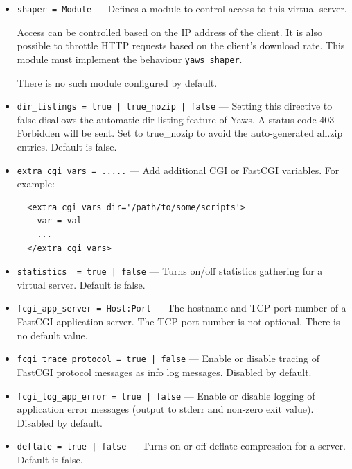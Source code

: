 \documentclass[11pt,oneside,english]{book}
\newcommand{\Yaws}            %
        {{\sc Yaws}}
\begin{document}
\begin{itemize}
\item       \verb+shaper = Module+ ---
              Defines a module to control access to this virtual server.

              Access can be controlled based on the IP address of the client. It
              is also possible to throttle HTTP requests based on the client's
              download rate. This module must implement the behaviour
              \verb+yaws_shaper+.

              There is no such module configured by default.

\item       \verb+dir_listings = true | true_nozip | false+ ---
             Setting this directive to false disallows the automatic dir listing
             feature of \Yaws{}. A status code 403 Forbidden will be sent.  Set
             to true\_nozip to avoid the auto-generated all.zip entries. Default
             is false.

\item       \verb+extra_cgi_vars = .....+ ---
             Add additional CGI or FastCGI variables. For example:
\begin{verbatim}
  <extra_cgi_vars dir='/path/to/some/scripts'>
    var = val
    ...
  </extra_cgi_vars>
\end{verbatim}

\item       \verb+statistics  = true | false+ ---
             Turns on/off statistics gathering for a virtual server. Default is
             false.

\item       \verb+fcgi_app_server = Host:Port+ ---
             The hostname and TCP port number of a FastCGI application
             server. The TCP port number is not optional. There is no default
             value.

\item       \verb+fcgi_trace_protocol = true | false+ ---
             Enable or disable tracing of FastCGI protocol messages as info log
             messages. Disabled by default.

\item       \verb+fcgi_log_app_error = true | false+ ---
             Enable or disable logging of application error messages (output to
             stderr and non-zero exit value). Disabled by default.

\item       \verb+deflate = true | false+ ---
             Turns on or off deflate compression for a server. Default is
             false.


\end{itemize}
\end{document}

